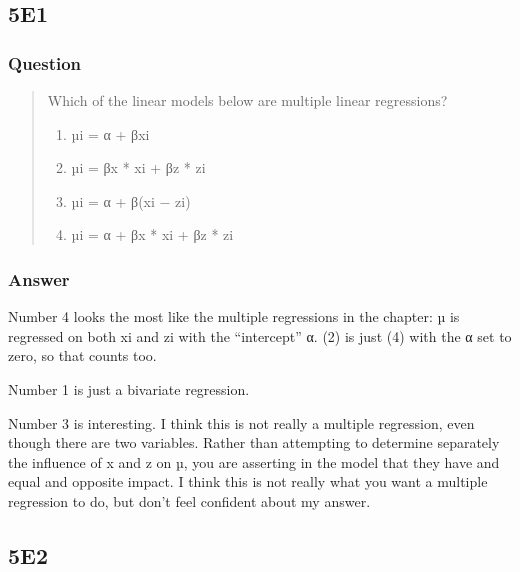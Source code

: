 \documentclass[
]{book}
\begin{document}
\hypertarget{e1-3}{%
\subsection*{5E1}\label{e1-3}}

\hypertarget{question-45}{%
\subsubsection*{Question}\label{question-45}}

\begin{quote}
Which of the linear models below are multiple linear regressions?

\begin{enumerate}
\def\labelenumi{(\arabic{enumi})}
\item
  µi = α + βxi
\item
  µi = βx * xi + βz * zi
\item
  µi = α + β(xi − zi)
\item
  µi = α + βx * xi + βz * zi
\end{enumerate}
\end{quote}

\hypertarget{answer-45}{%
\subsubsection*{Answer}\label{answer-45}}

Number 4 looks the most like the multiple regressions in the chapter: µ is regressed on both xi and zi with the ``intercept'' α. (2) is just (4) with the α set to zero, so that counts too.

Number 1 is just a bivariate regression.

Number 3 is interesting. I think this is not really a multiple regression, even though there are two variables. Rather than attempting to determine separately the influence of x and z on µ, you are asserting in the model that they have and equal and opposite impact. I think this is not really what you want a multiple regression to do, but don't feel confident about my answer.

\hypertarget{e2-3}{%
\subsection*{5E2}\label{e2-3}}
\end{document}

